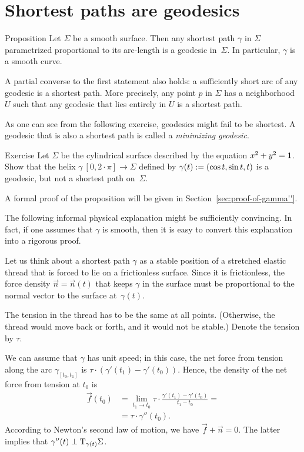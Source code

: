 \section{Shortest paths are geodesics}

\begin{thm}{Proposition}\label{prop:gamma''}
Let $\Sigma$ be a smooth surface.
Then any shortest path $\gamma$ in $\Sigma$ parametrized proportional to its arc-length is a geodesic in~$\Sigma$.
In particular, $\gamma$ is a smooth curve.

A partial converse to the first statement also holds: a sufficiently short arc of any geodesic is a shortest path.
More precisely, any point $p$ in $\Sigma$ has a neighborhood $U$ such that any geodesic that lies entirely in $U$ is a shortest path.
\end{thm}

As one can see from the following exercise, geodesics might fail to be shortest.
A geodesic that is also a shortest path is called a \emph{minimizing geodesic}.

\begin{thm}{Exercise}\label{ex:helix=geodesic}
Let $\Sigma$ be the cylindrical surface described by the equation $x^2\z+y^2=1$.
Show that the helix $\gamma\:[0,2\cdot\pi]\to \Sigma$ defined by $\gamma(t)\z\df(\cos t,\sin t, t)$
is a geodesic, but not a shortest path on~$\Sigma$.
\end{thm}

A formal proof of the proposition will be given in Section~\ref{sec:proof-of-gamma''}.

The following informal physical explanation might be sufficiently convincing.
In fact, if one assumes that $\gamma$ is smooth, then it is easy to convert this explanation into a rigorous proof.

Let us think about a shortest path $\gamma$ as a stable position of a stretched elastic thread that is forced to lie on a frictionless surface.
Since it is frictionless, the force density $\vec n=\vec n(t)$ that keeps $\gamma$ in the surface must be proportional to the normal vector to the surface at~$\gamma(t)$.

The tension in the thread has to be the same at all points. (Otherwise, the thread would move back or forth, and it would not be stable.)
Denote the tension by $\tau$.

We can assume that $\gamma$ has unit speed;
in this case, the net force from tension along the arc $\gamma_{[t_0,t_1]}$ is $\tau\cdot(\gamma'(t_1)-\gamma'(t_0))$.
Hence, the density of the net force from tension at $t_0$ is 
\begin{align*}
\vec f(t_0)&=\lim_{t_1\to t_0}\tau\cdot\frac{\gamma'(t_1)-\gamma'(t_0)}{t_1-t_0}=
\\
&=\tau\cdot\gamma''(t_0).
\end{align*}
According to Newton's second law of motion, we have 
$\vec f+\vec n=0$.
The latter implies that $\gamma''(t)\perp\mathrm{T}_{\gamma(t)}\Sigma$.
\qeds

